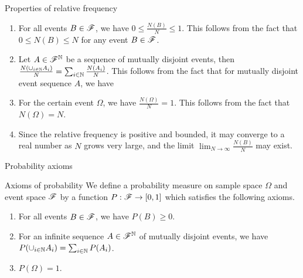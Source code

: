 \documentclass[12pt,aspectratio=169]{beamer}
\begin{document}
\begin{frame}{Properties of relative frequency}
    \begin{enumerate}
        \item <1-> For all events $B \in \mathscr{F}$, we have $0 \le \frac{N(B)}{N} \le 1$. 
        This follows from the fact that $0 \le N(B) \le N$ for any event $B \in \mathscr{F}$. 
        \item <2-> Let $A\in\mathscr{F}^{\mathbb{N}}$ be a sequence of mutually disjoint events,   
        then $\frac{N(\cup_{i \in \mathbb{N}}A_i)}{N} =  \sum_{i\in \mathbb{N}}\frac{N(A_i)}{N}$. 
        This follows from the fact that for mutually disjoint event sequence $A$, we have 
        \item <3-> For the certain event $\Omega$, we have $\frac{N(\Omega)}{N} = 1$. 
        This follows from the fact that $N(\Omega) = N$. 
        \item <4-> Since the relative frequency is positive and bounded, it may converge to a real number as $N$ grows very large, and the limit $\lim_{N \to \infty}\frac{N(B)}{N}$ may exist. 
    \end{enumerate}
\end{frame}

\begin{frame}{Probability axioms}
    \begin{block}{Axioms of probability}
    We define a probability measure on sample space $\Omega$ and event space $\mathscr{F}$ by a function $P: \mathscr{F} \to [0,1]$ which satisfies the following axioms. 
    \begin{enumerate}
        \item <2-> [\textbf{Non-negativity:}] For all events $B \in \mathscr{F}$, we have $P(B) \ge 0$. 
        \item <3-> [\textbf{$\sigma$-additivity:}] For an infinite sequence $A \in \mathscr{F}^{\mathbb{N}}$ of mutually disjoint events,  
        we have $P(\cup_{i \in \mathbb{N}}A_i) = \sum_{i \in \mathbb{N}}P(A_i)$. 
        \item <4-> [\textbf{Certainty:}] $P(\Omega) = 1$. 
    \end{enumerate} 
    \end{block}
\end{frame}
\end{document}

